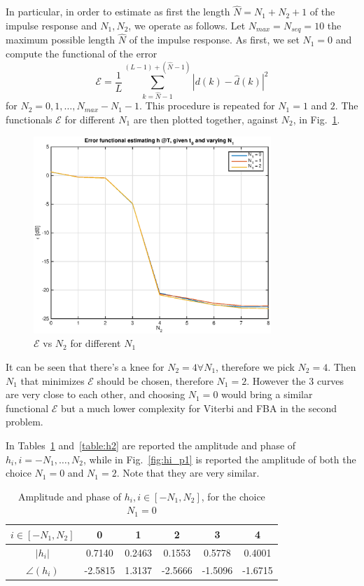 \documentclass[10pt]{article}
\begin{document}
In particular, in order to estimate as first the length $\hat{N} = N_1 + N_2 + 1$ of the impulse response and $N_1, N_2$, we operate as follows. Let $N_{max} = N_{seq} = 10$ the maximum possible length $\hat{N}$ of the impulse response. As first, we set $N_1 = 0$ and compute the functional of the error 
\begin{equation} 
	\mathcal{E} = \frac{1}{L}\sum_{k = \hat{N} - 1}^{(L-1)+(\hat{N}-1)}|d(k)-\hat{d}(k)|^2
	\label{eq:functional}
\end{equation}
for $N_2 = 0, 1, \dots, N_{max} - N_1 - 1$. This procedure is repeated for $N_1 = 1$ and $2$. The functionals $\mathcal{E}$ for different $N_1$ are then plotted together, against $N_2$, in Fig.~\ref{fig:functional}.
\begin{figure}[h!]
	\centering
	\includegraphics[width = 0.8\textwidth]{error_func_p1}
	\caption{$\mathcal{E}$ vs $N_2$ for different $N_1$}
	\label{fig:functional}
\end{figure}
It can be seen that there's a knee for $N_2 = 4 \forall N_1$, therefore we pick $N_2 = 4$. Then $N_1$ that minimizes $\mathcal{E}$ should be chosen, therefore $N_1 = 2$. However the 3 curves are very close to each other, and choosing $N_1 = 0$ would bring a similar functional $\mathcal{E}$ but a much lower complexity for Viterbi and FBA in the second problem. 

In Tables~\ref{table:h0} and~\ref{table:h2} are reported the amplitude and phase of $h_i, i = -N_1, \dots, N_2$, while in Fig.~\ref{fig:hi_p1} is reported the amplitude of both the choice $N_1 = 0$ and $N_1 = 2$. Note that they are very similar.


\begin{table}[h!]
	\centering
	\begin{tabular}{c|c|c|c|c|c}
		$i \in [-N_1, N_2]$ & 0 & 1 & 2 & 3 & 4 \\ \hline
		$|h_i|$ 		& 0.7140  &  0.2463  &  0.1553  &  0.5778  &  0.4001 \\
		$\angle(h_i)$ 	& -2.5815  &  1.3137  & -2.5666  & -1.5096  & -1.6715 \\
	\end{tabular}
	\caption{Amplitude and phase of $h_i, i \in [-N_1, N_2]$, for the choice $N_1 = 0$}
	\label{table:h0}
\end{table}
\end{document}

